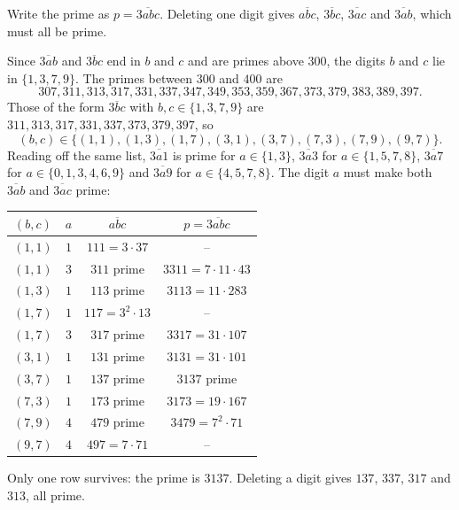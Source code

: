 Write the prime as $p=\overline{3abc}$. Deleting one digit gives $\overline{abc}$, $\overline{3bc}$, $\overline{3ac}$ and $\overline{3ab}$, which must all be prime.

Since $\overline{3ab}$ and $\overline{3bc}$ end in $b$ and $c$ and are primes above $300$, the digits $b$ and $c$ lie in $\{1,3,7,9\}$. The primes between $300$ and $400$ are
\[
307,311,313,317,331,337,347,349,353,359,367,373,379,383,389,397 .
\]
Those of the form $\overline{3bc}$ with $b,c\in\{1,3,7,9\}$ are $311,313,317,331,337,373,379,397$, so
\[
(b,c)\in\{(1,1),(1,3),(1,7),(3,1),(3,7),(7,3),(7,9),(9,7)\}.
\]
Reading off the same list, $\overline{3a1}$ is prime for $a\in\{1,3\}$, $\overline{3a3}$ for $a\in\{1,5,7,8\}$, $\overline{3a7}$ for $a\in\{0,1,3,4,6,9\}$ and $\overline{3a9}$ for $a\in\{4,5,7,8\}$. The digit $a$ must make both $\overline{3ab}$ and $\overline{3ac}$ prime:
\begin{center}
\begin{tabular}{cccc}
$(b,c)$ & $a$ & $\overline{abc}$ & $p=\overline{3abc}$\\ \hline
$(1,1)$ & $1$ & $111=3\cdot37$ & --\\
$(1,1)$ & $3$ & $311$ prime & $3311=7\cdot11\cdot43$\\
$(1,3)$ & $1$ & $113$ prime & $3113=11\cdot283$\\
$(1,7)$ & $1$ & $117=3^2\cdot13$ & --\\
$(1,7)$ & $3$ & $317$ prime & $3317=31\cdot107$\\
$(3,1)$ & $1$ & $131$ prime & $3131=31\cdot101$\\
$(3,7)$ & $1$ & $137$ prime & $3137$ prime\\
$(7,3)$ & $1$ & $173$ prime & $3173=19\cdot167$\\
$(7,9)$ & $4$ & $479$ prime & $3479=7^2\cdot71$\\
$(9,7)$ & $4$ & $497=7\cdot71$ & --
\end{tabular}
\end{center}
Only one row survives: the prime is $\boxed{3137}$. Deleting a digit gives $137$, $337$, $317$ and $313$, all prime.
